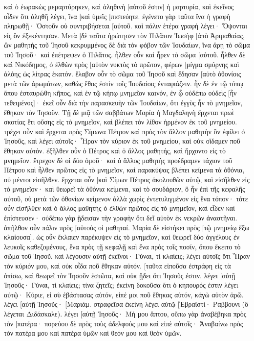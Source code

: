 καὶ ὁ ἑωρακὼς μεμαρτύρηκεν, καὶ ἀληθινὴ [αὐτοῦ ἐστιν] ἡ μαρτυρία, καὶ ἐκεῖνος οἶδεν ὅτι ἀληθῆ λέγει, ἵνα [καὶ ὑμεῖς [πιστεύητε. 
ἐγένετο γὰρ ταῦτα ἵνα ἡ γραφὴ πληρωθῇ· Ὀστοῦν οὐ συντριβήσεται [αὐτοῦ. 
καὶ πάλιν ἑτέρα γραφὴ λέγει· Ὄψονται εἰς ὃν ἐξεκέντησαν. 
Μετὰ [δὲ ταῦτα ἠρώτησεν τὸν Πιλᾶτον Ἰωσὴφ [ἀπὸ Ἁριμαθαίας, ὢν μαθητὴς τοῦ Ἰησοῦ κεκρυμμένος δὲ διὰ τὸν φόβον τῶν Ἰουδαίων, ἵνα ἄρῃ τὸ σῶμα τοῦ Ἰησοῦ· καὶ ἐπέτρεψεν ὁ Πιλᾶτος. ἦλθεν οὖν καὶ ἦρεν τὸ σῶμα [αὐτοῦ. 
ἦλθεν δὲ καὶ Νικόδημος, ὁ ἐλθὼν πρὸς [αὐτὸν νυκτὸς τὸ πρῶτον, φέρων [μίγμα σμύρνης καὶ ἀλόης ὡς λίτρας ἑκατόν. 
ἔλαβον οὖν τὸ σῶμα τοῦ Ἰησοῦ καὶ ἔδησαν [αὐτὸ ὀθονίοις μετὰ τῶν ἀρωμάτων, καθὼς ἔθος ἐστὶν τοῖς Ἰουδαίοις ἐνταφιάζειν. 
ἦν δὲ ἐν τῷ τόπῳ ὅπου ἐσταυρώθη κῆπος, καὶ ἐν τῷ κήπῳ μνημεῖον καινόν, ἐν ᾧ οὐδέπω οὐδεὶς [ἦν τεθειμένος]· 
ἐκεῖ οὖν διὰ τὴν παρασκευὴν τῶν Ἰουδαίων, ὅτι ἐγγὺς ἦν τὸ μνημεῖον, ἔθηκαν τὸν Ἰησοῦν. 
Τῇ δὲ μιᾷ τῶν σαββάτων Μαρία ἡ Μαγδαληνὴ ἔρχεται πρωῒ σκοτίας ἔτι οὔσης εἰς τὸ μνημεῖον, καὶ βλέπει τὸν λίθον ἠρμένον ἐκ τοῦ μνημείου. 
τρέχει οὖν καὶ ἔρχεται πρὸς Σίμωνα Πέτρον καὶ πρὸς τὸν ἄλλον μαθητὴν ὃν ἐφίλει ὁ Ἰησοῦς, καὶ λέγει αὐτοῖς· Ἦραν τὸν κύριον ἐκ τοῦ μνημείου, καὶ οὐκ οἴδαμεν ποῦ ἔθηκαν αὐτόν. 
ἐξῆλθεν οὖν ὁ Πέτρος καὶ ὁ ἄλλος μαθητής, καὶ ἤρχοντο εἰς τὸ μνημεῖον. 
ἔτρεχον δὲ οἱ δύο ὁμοῦ· καὶ ὁ ἄλλος μαθητὴς προέδραμεν τάχιον τοῦ Πέτρου καὶ ἦλθεν πρῶτος εἰς τὸ μνημεῖον, 
καὶ παρακύψας βλέπει κείμενα τὰ ὀθόνια, οὐ μέντοι εἰσῆλθεν. 
ἔρχεται οὖν [καὶ Σίμων Πέτρος ἀκολουθῶν αὐτῷ, καὶ εἰσῆλθεν εἰς τὸ μνημεῖον· καὶ θεωρεῖ τὰ ὀθόνια κείμενα, 
καὶ τὸ σουδάριον, ὃ ἦν ἐπὶ τῆς κεφαλῆς αὐτοῦ, οὐ μετὰ τῶν ὀθονίων κείμενον ἀλλὰ χωρὶς ἐντετυλιγμένον εἰς ἕνα τόπον· 
τότε οὖν εἰσῆλθεν καὶ ὁ ἄλλος μαθητὴς ὁ ἐλθὼν πρῶτος εἰς τὸ μνημεῖον, καὶ εἶδεν καὶ ἐπίστευσεν· 
οὐδέπω γὰρ ᾔδεισαν τὴν γραφὴν ὅτι δεῖ αὐτὸν ἐκ νεκρῶν ἀναστῆναι. 
ἀπῆλθον οὖν πάλιν πρὸς [αὑτοὺς οἱ μαθηταί. 
Μαρία δὲ εἱστήκει πρὸς [τῷ μνημείῳ ἔξω κλαίουσα]. ὡς οὖν ἔκλαιεν παρέκυψεν εἰς τὸ μνημεῖον, 
καὶ θεωρεῖ δύο ἀγγέλους ἐν λευκοῖς καθεζομένους, ἕνα πρὸς τῇ κεφαλῇ καὶ ἕνα πρὸς τοῖς ποσίν, ὅπου ἔκειτο τὸ σῶμα τοῦ Ἰησοῦ. 
καὶ λέγουσιν αὐτῇ ἐκεῖνοι· Γύναι, τί κλαίεις; λέγει αὐτοῖς ὅτι Ἦραν τὸν κύριόν μου, καὶ οὐκ οἶδα ποῦ ἔθηκαν αὐτόν. 
[ταῦτα εἰποῦσα ἐστράφη εἰς τὰ ὀπίσω, καὶ θεωρεῖ τὸν Ἰησοῦν ἑστῶτα, καὶ οὐκ ᾔδει ὅτι Ἰησοῦς ἐστιν. 
λέγει [αὐτῇ Ἰησοῦς· Γύναι, τί κλαίεις; τίνα ζητεῖς; ἐκείνη δοκοῦσα ὅτι ὁ κηπουρός ἐστιν λέγει αὐτῷ· Κύριε, εἰ σὺ ἐβάστασας αὐτόν, εἰπέ μοι ποῦ ἔθηκας αὐτόν, κἀγὼ αὐτὸν ἀρῶ. 
λέγει [αὐτῇ Ἰησοῦς· [Μαριάμ. στραφεῖσα ἐκείνη λέγει αὐτῷ [Ἑβραϊστί· Ραββουνι (ὃ λέγεται Διδάσκαλε). 
λέγει [αὐτῇ Ἰησοῦς· Μή μου ἅπτου, οὔπω γὰρ ἀναβέβηκα πρὸς τὸν [πατέρα· πορεύου δὲ πρὸς τοὺς ἀδελφούς μου καὶ εἰπὲ αὐτοῖς· Ἀναβαίνω πρὸς τὸν πατέρα μου καὶ πατέρα ὑμῶν καὶ θεόν μου καὶ θεὸν ὑμῶν. 
